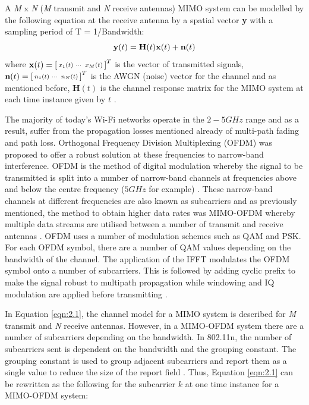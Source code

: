 A \textit{M} x \textit{N} (\textit{M} transmit and \textit{N} receive antennas) MIMO system can be modelled by the following equation at the receive antenna by a spatial vector \textbf{y} with a sampling period of T = 1/Bandwidth:
\vspace{-11pt}
\begin{equation}\label{eqn:2.1}
    \textbf{y}(t) = \textbf{H}(t)\textbf{x}(t)+\textbf{n}(t)
    \vspace{-11pt}
\end{equation}
where  $\textbf{x}(t) = \begin{bsmallmatrix}x_1(t) & \cdots & x_M(t)\end{bsmallmatrix}^T$ is the vector of transmitted signals, $\textbf{n}(t) = \begin{bsmallmatrix}n_1(t) & \cdots & n_N(t)\end{bsmallmatrix}^T$ is the AWGN (noise) vector for the channel and as mentioned before, $\textbf{H}(t)$ is the channel response matrix for the MIMO system at each time instance given by $t$ \citep{channelEquations}. \par
The majority of today's Wi-Fi networks operate in the $2-5GHz$ range and as a result, suffer from the propagation losses mentioned already of multi-path fading and path loss. Orthogonal Frequency Division Multiplexing (OFDM) was proposed to offer a robust solution at these frequencies to narrow-band interference. OFDM is the method of digital modulation whereby the signal to be transmitted is split into a number of narrow-band channels at frequencies above and below the centre frequency ($5GHz$ for example) \citep{OFDM}.
These narrow-band channels at different frequencies are also known as subcarriers and as previously mentioned, the method to obtain higher data rates was MIMO-OFDM whereby multiple data streams are utilised between a number of transmit and receive antennas \citep{802.11nStandard}. OFDM uses a number of modulation schemes such as QAM and PSK. For each OFDM symbol, there are a number of QAM values depending on the bandwidth of the channel. The application of the IFFT modulates the OFDM symbol onto a number of subcarriers. This is followed by adding cyclic prefix to make the signal robust to multipath propagation while windowing and IQ modulation are applied before transmitting \citep{OFDM, 802.11nStandard}. \par
In Equation \ref{eqn:2.1}, the channel model for a MIMO system is described for \textit{M} transmit and \textit{N} receive antennas. However, in a MIMO-OFDM system there are a number of subcarriers depending on the bandwidth. In 802.11n, the number of subcarriers sent is dependent on the bandwidth and the grouping constant. The grouping constant is used to group adjacent subcarriers and report them as a single value to reduce the size of the report field \citep{full802.11nStandard}. Thus, Equation \ref{eqn:2.1} can be rewritten as the following for the subcarrier $k$ at one time instance for a MIMO-OFDM system:
